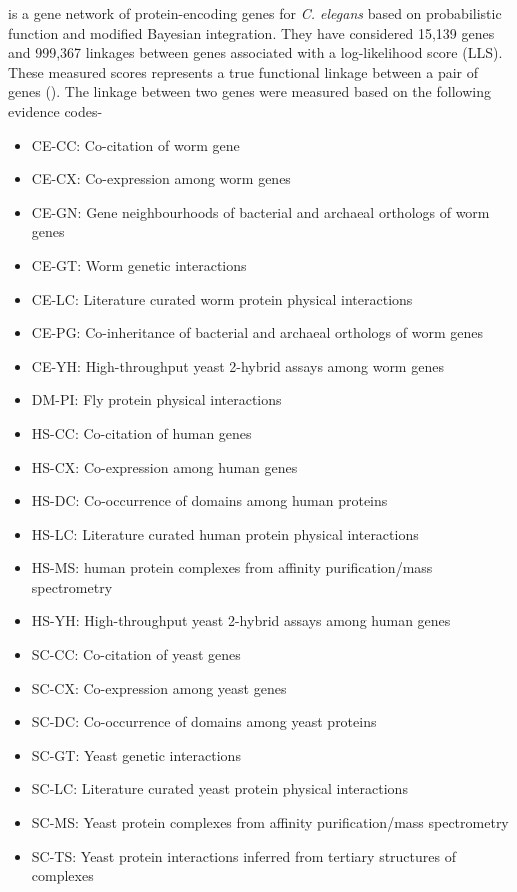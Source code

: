 \cite{WormNet} is a gene network of protein-encoding genes for \textit{C. elegans} based on probabilistic function and modified Bayesian integration. They have considered 15,139 genes and 999,367 linkages between genes associated with a log-likelihood score (LLS). These measured scores represents a true functional linkage between a pair of genes (\cite{Lee:2007}). The linkage between two genes were measured based on the following evidence codes-
\begin{itemize}
 \item CE-CC: 	Co-citation of worm gene
 \item CE-CX: 	Co-expression among worm genes
 \item CE-GN: 	Gene neighbourhoods of bacterial and archaeal orthologs of worm genes
 \item CE-GT: 	Worm genetic interactions
 \item CE-LC: 	Literature curated worm protein physical interactions
 \item CE-PG: 	Co-inheritance of bacterial and archaeal orthologs of worm genes
 \item CE-YH: 	High-throughput yeast 2-hybrid assays among worm genes
 \item DM-PI: 	Fly protein physical interactions
 \item HS-CC: 	Co-citation of human genes
 \item HS-CX: 	Co-expression among human genes
 \item HS-DC: 	Co-occurrence of domains among human proteins
 \item HS-LC: 	Literature curated human protein physical interactions
 \item HS-MS: 	human protein complexes from affinity purification/mass spectrometry
 \item HS-YH: 	High-throughput yeast 2-hybrid assays among human genes
 \item SC-CC: 	Co-citation of yeast genes
 \item SC-CX: 	Co-expression among yeast genes
 \item SC-DC: 	Co-occurrence of domains among yeast proteins
 \item SC-GT: 	Yeast genetic interactions
 \item SC-LC: 	Literature curated yeast protein physical interactions
 \item SC-MS: 	Yeast protein complexes from affinity purification/mass spectrometry
 \item SC-TS: 	Yeast protein interactions inferred from tertiary structures of complexes
\end{itemize}

